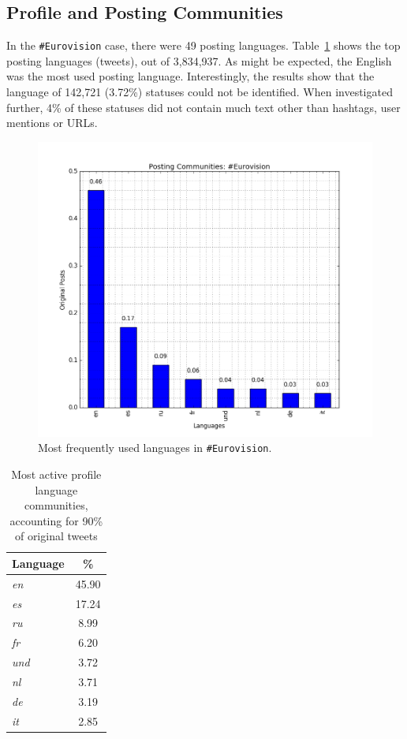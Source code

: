 \subsection{Profile and Posting Communities}\label{ppcomm}

In the {\texttt{\#Eurovision}} case, there were 49 posting
languages. Table~\ref{tbl:activelangs} shows the top posting languages
(tweets), out of 3,834,937. As
might be expected, the English was the most used posting
language. Interestingly, the results show that the language of 142,721
(3.72\%) statuses could not be identified. When investigated further,
4\% of these statuses did not contain much text other than
hashtags, user mentions or URLs.

\begin{figure}[htb]
\centering
\includegraphics[width=\columnwidth]{images/eurovision_langfreq.png}
\caption{Most frequently used languages in {\texttt{\#Eurovision}}.}
\label{fig:eurovisionlangfreq}
\end{figure}

\begin{table}[!htb]
\centering
\begin{tabular}{@{}lc}
\toprule
\textbf{Language} & \textbf{\%} \\ 
\midrule
{\emph{en}} & 45.90 \\
{\emph{es}} & 17.24 \\
{\emph{ru}} & 8.99 \\
{\emph{fr}} & 6.20 \\
{\emph{und}} & 3.72 \\
{\emph{nl}} & 3.71 \\
{\emph{de}} & 3.19 \\
{\emph{it}} & 2.85 \\ 
\bottomrule
\end{tabular}
\caption{Most active profile language
  communities, accounting for 90\% of original tweets}
\label{tbl:activelangs}
\end{table}


